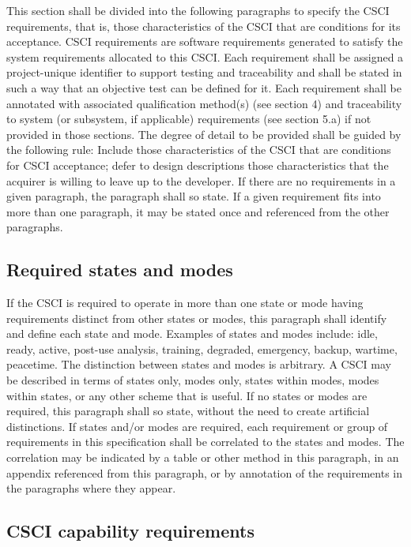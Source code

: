 \documentclass{fidata-report-template}
\begin{document}
This section shall be divided into the following paragraphs to specify
the CSCI requirements, that is, those characteristics of the CSCI that
are conditions for its acceptance. CSCI requirements are software
requirements generated to satisfy the system requirements allocated to
this CSCI. Each requirement shall be assigned a project-unique
identifier to support testing and traceability and shall be stated in
such a way that an objective test can be defined for it. Each
requirement shall be annotated with associated qualification method(s)
(see section 4) and traceability to system (or subsystem, if applicable)
requirements (see section 5.a) if not provided in those sections. The
degree of detail to be provided shall be guided by the following rule:
Include those characteristics of the CSCI that are conditions for CSCI
acceptance; defer to design descriptions those characteristics that the
acquirer is willing to leave up to the developer. If there are no
requirements in a given paragraph, the paragraph shall so state. If a
given requirement fits into more than one paragraph, it may be stated
once and referenced from the other paragraphs.

\subsection{Required states and modes}

If the CSCI is required to operate in more than one state or mode having
requirements distinct from other states or modes, this paragraph shall
identify and define each state and mode. Examples of states and modes
include: idle, ready, active, post-use analysis, training, degraded,
emergency, backup, wartime, peacetime. The distinction between states
and modes is arbitrary. A CSCI may be described in terms of states only,
modes only, states within modes, modes within states, or any other
scheme that is useful. If no states or modes are required, this
paragraph shall so state, without the need to create artificial
distinctions. If states and/or modes are required, each requirement or
group of requirements in this specification shall be correlated to the
states and modes. The correlation may be indicated by a table or other
method in this paragraph, in an appendix referenced from this paragraph,
or by annotation of the requirements in the paragraphs where they
appear.

\subsection{CSCI capability requirements}
\end{document}
